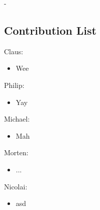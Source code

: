 -\subsection{Contribution List}
Claus: 
\begin{itemize}
\item Wee
\end{itemize}
Philip:
\begin{itemize}
\item Yay
\end{itemize} 
Michael: 
\begin{itemize}
\item Mah
\end{itemize}
Morten: 
\begin{itemize}
\item ...
\end{itemize}
Nicolai: 
\begin{itemize}
\item asd
\end{itemize}
\newpage